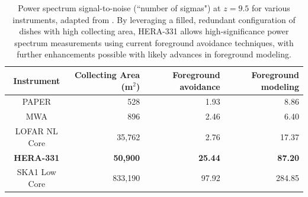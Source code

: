 \documentclass[preprint]{aastex}
\begin{document}
\begin{table}
\centering
\begin{tabular}{c||r||r|r} 
Instrument & Collecting Area (m$^2$) & Foreground avoidance & Foreground modeling \\
\hline
PAPER & 528 & 1.93 & 8.86 \\
MWA & 896 & 2.46 & 6.40 \\
LOFAR NL Core & 35,762 & 2.76 & 17.37 \\
\textbf{HERA-331} & \textbf{50,900} & \textbf{25.44} & \textbf{87.20} \\
SKA1 Low Core & 833,190 & 97.92 & 284.85 \\
\end{tabular}
\caption{Power spectrum signal-to-noise (``number of sigmas") at $z=9.5$ for various instruments, adapted from \citet{pober_et_al2014}.  By leveraging a filled, redundant configuration of dishes with high collecting area, HERA-331 allows high-significance power spectrum measurements using current foreground avoidance techniques, with further enhancements possible with likely advances in foreground modeling.}
\label{tab:signif}
\end{table}


%
\end{document}

